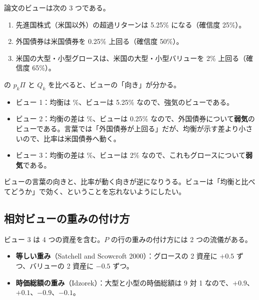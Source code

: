 論文のビューは次の 3 つである。

\begin{enumerate}
\item 先進国株式（米国以外）の超過リターンは 5.25\% になる（確信度 25\%）。
\item 外国債券は米国債券を 0.25\% 上回る（確信度 50\%）。
\item 米国の大型・小型グロースは、米国の大型・小型バリューを 2\% 上回る（確信度 65\%）。
\end{enumerate}

\begin{table}[htbp]
\centering
\caption{3 つのビュー。$p_k\Pi$ は均衡が示すビューの値。$\omega^{\mathrm{HL}}$ は He--Litterman の $\tau p_k\Sigma p_k\T$（$\tau=0.025$）、$\omega^{\mathrm{Idz}}$ は確信度 $C_k$ から決めた値。}
\label{tab:idz-views}
\end{table}

 の $p_k\Pi$ と $Q_k$ を比べると、ビューの「向き」が分かる。

\begin{itemize}
\item ビュー 1：均衡は \%、ビューは 5.25\% なので、強気のビューである。
\item ビュー 2：均衡の差は \%、ビューは 0.25\% なので、外国債券について\textbf{弱気}のビューである。言葉では「外国債券が上回る」だが、均衡が示す差より小さいので、比率は米国債券へ動く。
\item ビュー 3：均衡の差は \%、ビューは 2\% なので、これもグロースについて\textbf{弱気}である。
\end{itemize}

ビューの言葉の向きと、比率が動く向きが逆になりうる。ビューは「均衡と比べてどうか」で効く、ということを忘れないようにしたい。

\subsection*{相対ビューの重みの付け方}

ビュー 3 は 4 つの資産を含む。$P$ の行の重みの付け方には 2 つの流儀がある。

\begin{itemize}
\item \textbf{等しい重み}（Satchell and Scowcroft 2000）：グロースの 2 資産に $+0.5$ ずつ、バリューの 2 資産に $-0.5$ ずつ。
\item \textbf{時価総額の重み}（Idzorek）：大型と小型の時価総額は 9 対 1 なので、$+0.9$、$+0.1$、$-0.9$、$-0.1$。
\end{itemize}

